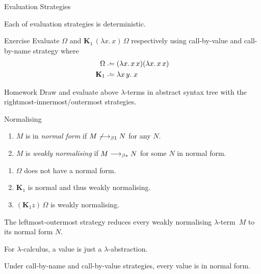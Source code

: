 \begin{frame}[allowframebreaks]{Evaluation Strategies}
\begin{proposition}[Determinacy]
  Each of evaluation strategies is deterministic. 
\end{proposition}
\begin{block}{Exercise}\label{ex:omega}
  Evaluate $\Omega$ and $\mathbf{K}_1\, (\lambda x.\, x)\, \Omega$ respectively 
  using call-by-value and call-by-name strategy
  where 
  \begin{align*}
    \Omega &\defeq (\lambda x.\, x\,x)(\lambda x.\,x\,x) \\
    \mathbf{K}_1 & \defeq \lambda x\,y.\;x
  \end{align*}
\end{block}
\begin{block}{Homework}
  Draw and evaluate above $\lambda$-terms in abstract syntax tree
  with the rightmost-innermost/outermost strategies.
\end{block}
\end{frame}
\begin{frame}[allowframebreaks]{Normalising}
\begin{definition}
  \begin{enumerate}
    \item $M$ is in \emph{normal form} if $M \not\longrightarrow_{\beta1} N$ for any $N$. 
    \item $M$ is \emph{weakly normalising} if $M \longrightarrow_{\beta*} N$ for some $N$ in
      normal form.
  \end{enumerate}
\end{definition}
%
  \begin{enumerate}
    \item $\Omega$ does not have a normal form.
    \item $\mathbf{K}_1$ is normal and thus weakly normalising.
    \item $(\mathbf{K}_1 z)\,\Omega$ is weakly normalising.
  \end{enumerate}

\begin{theorem}%
  The leftmost-outermost strategy reduces every weakly
  normalising $\lambda$-term~$M$ to its normal form $N$.
\end{theorem}

\begin{definition}
  For $\lambda$-calculus, a \alert{value} is just a $\lambda$-abstraction. 
\end{definition}
\begin{proposition}
  Under call-by-name and call-by-value strategies, 
  every value is in normal form.
\end{proposition}
\end{frame}


